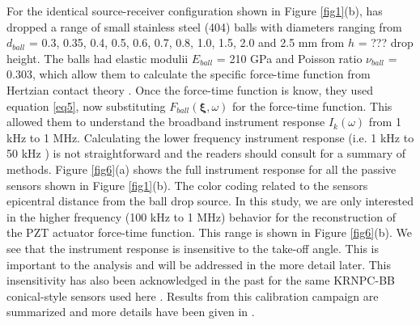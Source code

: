 \documentclass[preprint,3p, 11pt,authoryear]{elsarticle}
\begin{document}
For the identical source-receiver configuration shown in Figure \ref{fig1}(b), \citet{Wu} has dropped a range of small stainless steel (404) balls with diameters ranging from $d_{ball}$ = 0.3, 0.35, 0.4, 0.5, 0.6, 0.7, 0.8, 1.0, 1.5, 2.0 and 2.5 mm from $h$ = ??? drop height. The balls had elastic modulii $E_{ball}$ = 210 GPa and Poisson ratio $\nu_{ball}$ = 0.303, which allow them to calculate the specific force-time function from Hertzian contact theory \citep[see also e.g.][]{McLaskey2010, McLaskey2012}. Once the force-time function is know, they used equation \eqref{eq5}, now substituting $F_{ball}\left( \mathbf{\xi}, \omega \right)$ for the force-time function. This allowed them to understand the broadband instrument response $I_{k}(\omega)$ from 1 kHz to 1 MHz. Calculating the lower frequency instrument response (i.e. 1 kHz to 50 kHz ) is not straightforward and the readers should consult \citet{Wu2018} for a summary of methods. Figure \ref{fig6}(a) shows the full instrument response for all the passive sensors shown in Figure \ref{fig1}(b). The color coding related to the sensors epicentral distance from the ball drop source. In this study, we are only interested in the higher frequency (100 kHz to 1 MHz) behavior for the reconstruction of the PZT actuator force-time function. This range is shown in Figure \ref{fig6}(b). We see that the instrument response is insensitive to the take-off angle. This is important to the analysis and will be addressed in the more detail later. This insensitivity has also been acknowledged in the past for the same KRNPC-BB conical-style sensors used here \citep{Goodfellow2015, Selvadurai2019}.  Results from this calibration campaign are summarized and more details have been given in \citet{Wu}.
\end{document}
